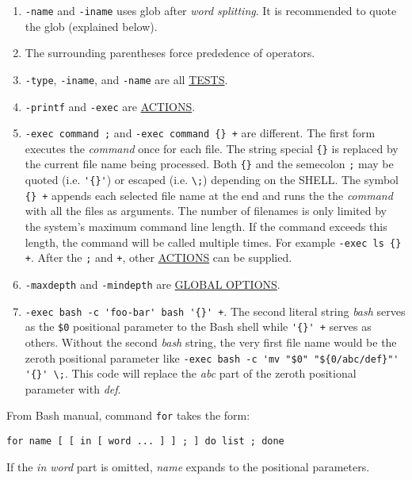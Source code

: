 \begin{enumerate}
\item \lstinline|-name| and \lstinline|-iname| uses glob after
  \textit{word splitting}. It is recommended to quote the glob
  (explained below).
\item The surrounding parentheses force prededence of operators.
\item \lstinline|-type|, \lstinline|-iname|, and \lstinline|-name|
  are all \uline{TESTS}.
\item \lstinline|-printf| and \lstinline|-exec| are
  \uline{ACTIONS}.
\item \lstinline|-exec command ;| and
  \lstinline|-exec command {} +| are different. The first form
  executes the \textit{command} once for each file. The string
  special \verb|{}| is replaced by the current file name being
  processed. Both \verb|{}| and the semecolon \verb|;| may be
  quoted (i.e. \verb|'{}'|) or escaped (i.e. \verb|\;|) depending
  on the SHELL. The symbol \verb|{} +| appends each selected file
  name at the end and runs the the \textit{command} with all the
  files as arguments. The number of filenames is only limited by
  the system's maximum command line length. If the command exceeds
  this length, the command will be called multiple times. For
  example \lstinline|-exec ls {} +|. After the \verb|;| and
  \verb|+|, other \uline{ACTIONS} can be supplied.
\item \lstinline|-maxdepth| and \lstinline|-mindepth| are
  \uline{GLOBAL OPTIONS}.
\item \lstinline|-exec bash -c 'foo-bar' bash '{}' +|. The second
  literal string \textit{bash} serves as the
  \lstinline|$0| positional parameter to the Bash shell while
  \lstinline|'{}' +| serves as others. Without the second
  \textit{bash} string, the very first file name would be the zeroth
  positional parameter like
  \lstinline|-exec bash -c 'mv "$0" "${0/abc/def}"' '{}' \;|.
  This code will replace the \textit{abc} part of the zeroth
  positional parameter with \textit{def}. 
\end{enumerate}

From Bash manual, command \lstinline|for| takes the form:

\begin{lstlisting}
for name [ [ in [ word ... ] ] ; ] do list ; done
\end{lstlisting}

If the \textit{in word} part is omitted, \textit{name} expands to
the positional parameters.

